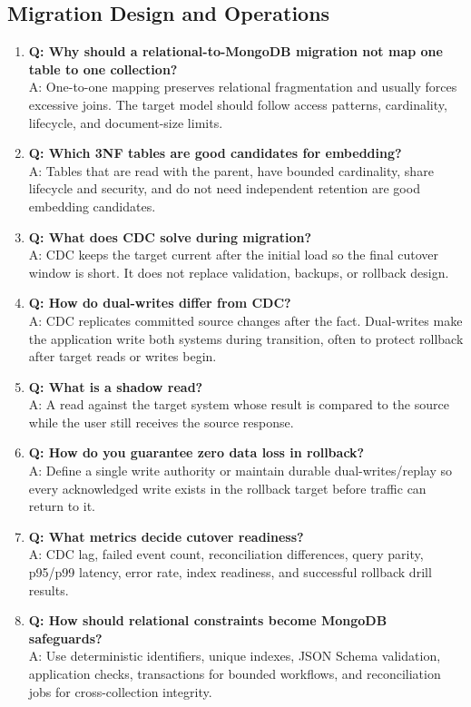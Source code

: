 \subsection{Migration Design and Operations}
\begin{enumerate}
    \item \textbf{Q: Why should a relational-to-MongoDB migration not map one table to one collection?}\\
    A: One-to-one mapping preserves relational fragmentation and usually forces excessive joins. The target model should follow access patterns, cardinality, lifecycle, and document-size limits.

    \item \textbf{Q: Which 3NF tables are good candidates for embedding?}\\
    A: Tables that are read with the parent, have bounded cardinality, share lifecycle and security, and do not need independent retention are good embedding candidates.

    \item \textbf{Q: What does CDC solve during migration?}\\
    A: CDC keeps the target current after the initial load so the final cutover window is short. It does not replace validation, backups, or rollback design.

    \item \textbf{Q: How do dual-writes differ from CDC?}\\
    A: CDC replicates committed source changes after the fact. Dual-writes make the application write both systems during transition, often to protect rollback after target reads or writes begin.

    \item \textbf{Q: What is a shadow read?}\\
    A: A read against the target system whose result is compared to the source while the user still receives the source response.

    \item \textbf{Q: How do you guarantee zero data loss in rollback?}\\
    A: Define a single write authority or maintain durable dual-writes/replay so every acknowledged write exists in the rollback target before traffic can return to it.

    \item \textbf{Q: What metrics decide cutover readiness?}\\
    A: CDC lag, failed event count, reconciliation differences, query parity, p95/p99 latency, error rate, index readiness, and successful rollback drill results.

    \item \textbf{Q: How should relational constraints become MongoDB safeguards?}\\
    A: Use deterministic identifiers, unique indexes, JSON Schema validation, application checks, transactions for bounded workflows, and reconciliation jobs for cross-collection integrity.
\end{enumerate}

